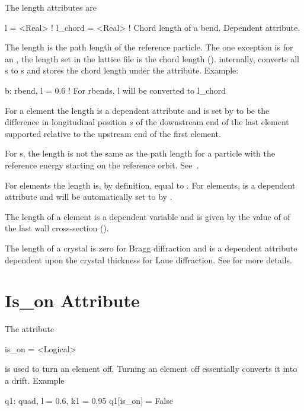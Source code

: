 The length attributes are
\begin{example}
  l       = <Real>  ! 
  l_chord = <Real>  ! Chord length of a bend. Dependent attribute.
\end{example}
The length  is the path length of the reference particle. The one exception is for an
, the length  set in the lattice file is the chord length
(). internally, \bmad converts all s to s and stores the chord
length under the  attribute.  Example:
\begin{example}
  b: rbend, l = 0.6   ! For rbends, l will be converted to l_chord
\end{example}

For a  element the length  is a dependent attribute and is set by \bmad to be the
difference in longitudinal position $s$ of the downstream end of the last element supported relative
to the upstream end of the first element.

For s, the length  is not the same as the path length for a particle with the
reference energy starting on the reference orbit. See~.

For  elements the  length is, by definition, equal to . For 
elements,  is a dependent attribute and will be automatically set to  by \bmad.

The length of a  element is a dependent variable and is given by the value of 
of the last wall cross-section ().

The length of a crystal is zero for Bragg diffraction and is a dependent attribute dependent upon
the crystal thickness for Laue diffraction. See  for more details.

\section{Is_on Attribute}
\label{s:is.on}

The  attribute
\begin{example}
  is_on = <Logical>
\end{example}
is used to turn an element off. Turning
an element off essentially converts it into a drift.
Example
\begin{example}
  q1: quad, l = 0.6, k1 = 0.95
  q1[is_on] = False
\end{example}

